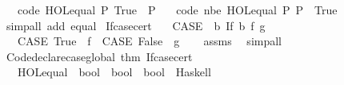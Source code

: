 \begin{isabellebody}
\ \ \ {\isacharbrackleft}{\kern0pt}code{\isacharbrackright}{\kern0pt}{\isacharcolon}{\kern0pt}\ {\isachardoublequoteopen}HOL{\isachardot}{\kern0pt}equal\ P\ True\ {\isasymlongleftrightarrow}\ P{\isachardoublequoteclose}\isanewline
\ \ \ {\isacharbrackleft}{\kern0pt}code\ nbe{\isacharbrackright}{\kern0pt}{\isacharcolon}{\kern0pt}\ {\isachardoublequoteopen}HOL{\isachardot}{\kern0pt}equal\ P\ P\ {\isasymlongleftrightarrow}\ True{\isachardoublequoteclose}\isanewline
%
\isadelimproof
\ \ %
\endisadelimproof
%
\isatagproof
{}\isamarkupfalse%
\ {\isacharparenleft}{\kern0pt}simp{\isacharunderscore}{\kern0pt}all\ add{\isacharcolon}{\kern0pt}\ equal{\isacharparenright}{\kern0pt}%
\endisatagproof
{\isafoldproof}%
%
\isadelimproof
\isanewline
%
\endisadelimproof
\isanewline
{}\isamarkupfalse%
\ If{\isacharunderscore}{\kern0pt}case{\isacharunderscore}{\kern0pt}cert{\isacharcolon}{\kern0pt}\isanewline
\ \ \ {\isachardoublequoteopen}CASE\ {\isasymequiv}\ {\isacharparenleft}{\kern0pt}{\isasymlambda}b{\isachardot}{\kern0pt}\ If\ b\ f\ g{\isacharparenright}{\kern0pt}{\isachardoublequoteclose}\isanewline
\ \ \ {\isachardoublequoteopen}{\isacharparenleft}{\kern0pt}CASE\ True\ {\isasymequiv}\ f{\isacharparenright}{\kern0pt}\ {\isacharampersand}{\kern0pt}{\isacharampersand}{\kern0pt}{\isacharampersand}{\kern0pt}\ {\isacharparenleft}{\kern0pt}CASE\ False\ {\isasymequiv}\ g{\isacharparenright}{\kern0pt}{\isachardoublequoteclose}\isanewline
%
\isadelimproof
\ \ %
\endisadelimproof
%
\isatagproof
{}\isamarkupfalse%
\ assms\ \isamarkupfalse%
\ simp{\isacharunderscore}{\kern0pt}all%
\endisatagproof
{\isafoldproof}%
%
\isadelimproof
\isanewline
%
\endisadelimproof
%
\isadelimML
\isanewline
%
\endisadelimML
%
\isatagML
{}\isamarkupfalse%
\ {\isacartoucheopen}Code{\isachardot}{\kern0pt}declare{\isacharunderscore}{\kern0pt}case{\isacharunderscore}{\kern0pt}global\ {\isacharat}{\kern0pt}{\isacharbraceleft}{\kern0pt}thm\ If{\isacharunderscore}{\kern0pt}case{\isacharunderscore}{\kern0pt}cert{\isacharbraceright}{\kern0pt}{\isacartoucheclose}%
\endisatagML
{\isafoldML}%
%
\isadelimML
\isanewline
%
\endisadelimML
\isanewline
{}\isamarkupfalse%
\isanewline
\ \ \ {\isachardoublequoteopen}HOL{\isachardot}{\kern0pt}equal\ {\isacharcolon}{\kern0pt}{\isacharcolon}{\kern0pt}\ bool\ {\isasymRightarrow}\ bool\ {\isasymRightarrow}\ bool{\isachardoublequoteclose}\ {\isasymrightharpoonup}\ {\isacharparenleft}{\kern0pt}Haskell{\isacharparenright}{\kern0pt}\ \ {}\ {\isachardoublequoteopen}{\isacharequal}{\kern0pt}{\isacharequal}{\kern0pt}{\isachardoublequoteclose}\isanewline

\end{isabellebody}
